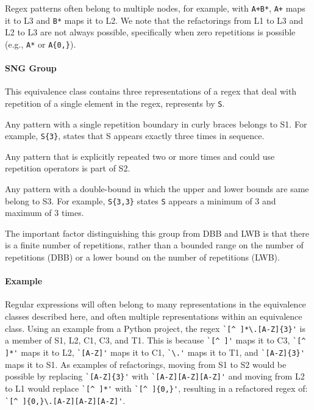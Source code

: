 Regex patterns often belong to multiple nodes, for example, with \verb!A+B*!,  \verb!A+! maps it to L3 and \verb!B*! maps it to L2. We note that the refactorings from L1 to L3 and L2 to L3 are not always possible, specifically when zero repetitions is possible (e.g., \verb!A*! or \verb!A{0,}!). 

\paragraph{SNG Group} This equivalence class contains  three representations of a regex that  deal with repetition of a single element in the regex, represents by \verb!S!.

\begin{description}  \itemsep -1pt
\item[S1:] Any pattern with a single repetition boundary in curly braces belongs to S1. For example,   \verb!S{3}!, states that S appears exactly three times in sequence.
\item[S2:] Any pattern that is explicitly repeated two or more times and could use repetition operators is part of S2.
\item[S3:] Any pattern with a double-bound in which the upper and lower bounds are same belong to S3. For example, \verb!S{3,3}! states \verb!S! appears a minimum of 3 and maximum of 3 times.
\end{description}

The important factor distinguishing this group from DBB and LWB is that there is a finite number of repetitions, rather than a bounded range on the number of repetitions (DBB) or a lower bound on the number of repetitions (LWB). 

\paragraph{Example}
Regular expressions will often belong to many representations in the equivalence classes described here, and often multiple representations within an equivalence class. 
Using an example from a Python project, the regex \verb!`[^ ]*\.[A-Z]{3}'! is a member of S1, L2, C1, C3, and T1. This is because \verb!`[^ ]'! maps it to C3, \verb!`[^ ]*'! maps it to L2, \verb!`[A-Z]'! maps it to C1, \verb!`\.'! maps it to T1, and \verb!`[A-Z]{3}'! maps it to S1. 
As examples of refactorings, moving from S1 to S2 would be possible by replacing  \verb!`[A-Z]{3}'! with  \verb!`[A-Z][A-Z][A-Z]'! and moving from L2 to L1 would replace \verb!`[^ ]*'! with \verb!`[^ ]{0,}'!, resulting in a refactored regex of:  \verb!`[^ ]{0,}\.[A-Z][A-Z][A-Z]'!. 

